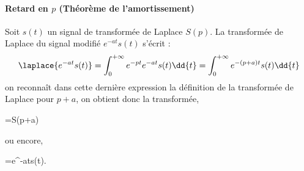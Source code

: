 \paragraph{Retard en $p$ (Théorème de l'amortissement)}
Soit $s(t)$ un signal de transformée de Laplace $S(p)$. La transformée 
de Laplace du signal modifié $e^{-at}s(t)$ s'écrit :
\[
\laplace{e^{-at}s(t)}
=\int_{0}^{+\infty} e^{-pt}e^{-at}s(t)\dd{t}
=\int_{0}^{+\infty} e^{-(p+a)t}s(t)\dd{t}
\]
on reconnaît dans cette dernière expression la définition de la transformée 
de Laplace pour $p+a$, on obtient donc la transformée, 
\begin{bequation}
    =S(p+a)
\end{bequation}
ou encore,
\begin{bequation}
    =e^{-at}s(t).
\end{bequation}
